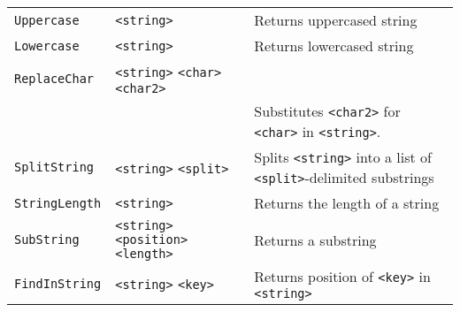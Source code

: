 \begin{longtable}{p{3cm}p{3cm}p{6cm}}
\verb+Uppercase+ &\verb+<string>+ & Returns uppercased string\\ 
\verb+Lowercase+ &\verb+<string>+ & Returns lowercased string\\ 
\verb+ReplaceChar+&\verb+<string>+ \verb+<char>+ \verb+<char2>+\\
& & Substitutes  \verb+<char2>+ for \verb+<char>+ in \verb+<string>+.\\
\verb+SplitString+ &\verb+<string>+ \verb+<split>+ & Splits \verb+<string>+ into a list of \verb+<split>+-delimited substrings \\ 
\verb+StringLength+ &\verb+<string>+ & Returns the length of a string\\ 
\verb+SubString+ &\verb+<string>+ \verb+<position>+ \verb+<length>+& Returns a substring\\ 
\verb+FindInString+ &\verb+<string>+ \verb+<key>+ & Returns position
of \verb+<key>+ in \verb+<string>+\\ 



\end{longtable} 


